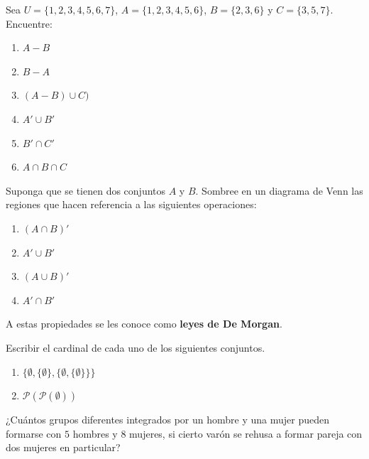 \begin{problema}
    Sea $U=\{1,2,3,4,5,6,7\}$, $A=\{1,2,3,4,5,6\}$, $B=\{2,3,6\}$ y $C=\{3,5,7\}$. Encuentre:
    \begin{multicols}{2}
    \renewcommand{\labelenumi}{\alph{enumi})}
    \begin{enumerate}
        \item $A-B$
        \item $B-A$
        \item $(A-B) \cup C)$
        \item $A'\cup B'$
        \item $B' \cap C'$
        \item $A \cap B \cap C$
    \end{enumerate}   
    \end{multicols}   
\end{problema}

\begin{problema}
    Suponga que se tienen dos conjuntos $A$ y $B$. Sombree en un diagrama de Venn las regiones que hacen referencia a las siguientes operaciones:
   \begin{multicols}{2}
        \renewcommand{\labelenumi}{\alph{enumi})}
    \begin{enumerate}
        \item $(A \cap B)'$
        \item $A' \cup B'$
        \item $(A \cup B)'$
        \item $A' \cap B'$
    \end{enumerate}
   \end{multicols}
    A estas propiedades se les conoce como \textbf{leyes de De Morgan}.
\end{problema}

\begin{problema}
Escribir el cardinal de cada uno de los siguientes conjuntos.
\begin{multicols}{2}
\renewcommand{\labelenumi}{\alph{enumi})}
    \begin{enumerate}
        \item $\{\emptyset, \{\emptyset\}, \{\emptyset, \{\emptyset\}\}\}$
        \item $\mathcal{P}(\mathcal{P}(\emptyset))$
    \end{enumerate}   
\end{multicols}
\end{problema}

\begin{problema}
¿Cuántos grupos diferentes integrados por un hombre y una mujer pueden formarse con $5$ hombres y $8$ mujeres, si cierto varón se rehusa a formar pareja con dos mujeres en particular?    
\end{problema}

